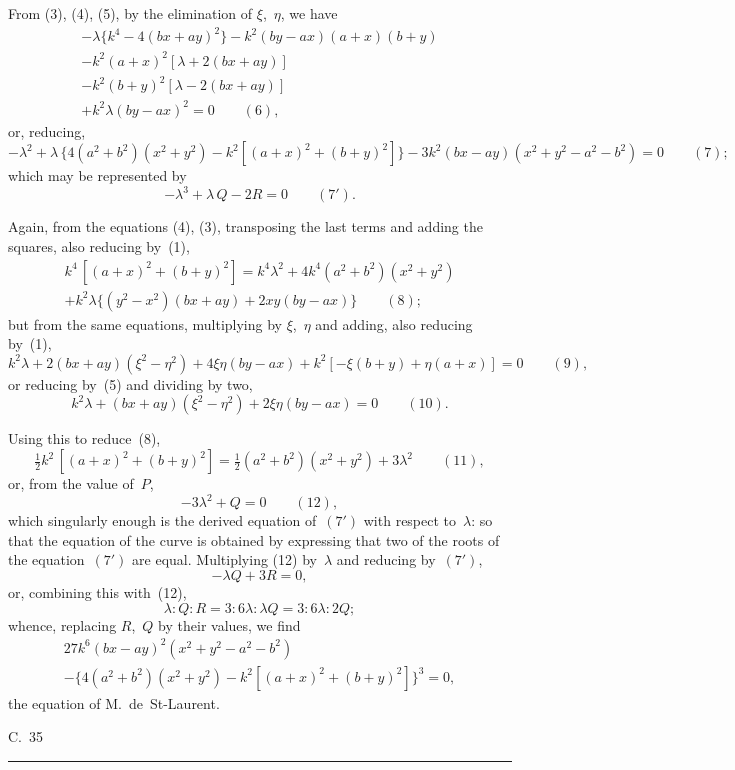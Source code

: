 \documentclass[11pt,a4paper]{article}
\begin{document}
From (3), (4), (5), by the elimination of $\xi$,~$\eta$, we have
\begin{multline*}
-\lambda\{k^4 - 4(bx+ay)^2\} - k^2(by-ax)(a+x)(b+y) \\
- k^2(a+x)^2[\lambda + 2(bx+ay)] \\
- k^2(b+y)^2[\lambda - 2(bx+ay)] \\
+ k^2\lambda(by-ax)^2 = 0 \qquad(6),
\end{multline*}
or, reducing,
\[
-\lambda^2 + \lambda\,\{4(a^2+b^2)(x^2+y^2) - k^2[(a+x)^2 + (b+y)^2]\} - 3k^2(bx-ay)(x^2+y^2-a^2-b^2) = 0 \qquad(7);
\]
which may be represented by
\[
-\lambda^3 + \lambda\,Q - 2R = 0 \qquad(7').
\]

Again, from the equations (4), (3), transposing the last terms and adding the squares, also reducing by~(1),
\begin{multline*}
k^4\,[(a+x)^2 + (b+y)^2] = k^4\lambda^2 + 4k^4(a^2+b^2)(x^2+y^2) \\
+ k^2\lambda\{(y^2-x^2)(bx+ay) + 2xy(by-ax)\} \qquad(8);
\end{multline*}
but from the same equations, multiplying by $\xi$,~$\eta$ and adding, also reducing by~(1),
\[
k^2\lambda + 2(bx+ay)(\xi^2-\eta^2) + 4\xi\eta(by-ax) + k^2[-\xi(b+y) + \eta(a+x)] = 0 \qquad(9),
\]
or reducing by~(5) and dividing by two,
\[
k^2\lambda + (bx+ay)(\xi^2-\eta^2) + 2\xi\eta(by-ax) = 0 \qquad(10).
\]

\newpage
Using this to reduce~(8),
\[
\tfrac{1}{2}k^2\,[(a+x)^2 + (b+y)^2] = \tfrac{1}{2}(a^2+b^2)(x^2+y^2) + 3\lambda^2 \qquad(11),
\]
or, from the value of~$P$,
\[
-3\lambda^2 + Q = 0 \qquad(12),
\]
which singularly enough is the derived equation of~$(7')$ with respect to~$\lambda$: so that the equation of the curve is obtained by expressing that two of the roots of the equation~$(7')$ are equal. Multiplying (12) by~$\lambda$ and reducing by~$(7')$,
\[
-\lambda Q + 3R = 0,
\]
or, combining this with~(12),
\[
\lambda : Q : R = 3 : 6\lambda : \lambda Q = 3 : 6\lambda : 2Q;
\]
whence, replacing $R$,~$Q$ by their values, we find
\begin{multline*}
27k^6(bx-ay)^2(x^2+y^2-a^2-b^2) \\
- \{4(a^2+b^2)(x^2+y^2) - k^2[(a+x)^2+(b+y)^2]\}^3 = 0,
\end{multline*}
the equation of M.~de~St-Laurent.

\begin{center}
C.~35
\end{center}

\vspace{20pt}
\begin{center}
\rule{0.5\textwidth}{0.4pt}
\end{center}
\end{document}
